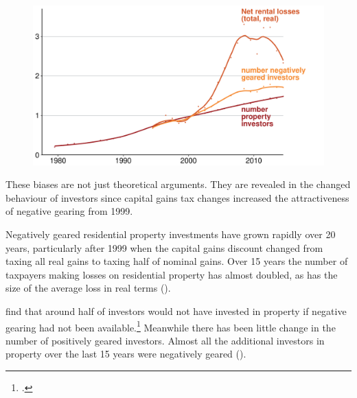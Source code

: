 \begin{figure}
\label{fig:number-NG-and-net-losses-time-series}
\includegraphics[width=1.16\columnwidth]{CGT-NG-atlas/NG-over-time.pdf}
\end{figure}

These biases are not just theoretical arguments. 
They are revealed in the changed behaviour of investors since capital gains tax changes increased the attractiveness of negative gearing from 1999.

Negatively geared residential property investments have grown rapidly over 20 years, particularly after 1999 when the capital gains discount changed from taxing all real gains to taxing half of nominal gains. 
Over 15 years the number of taxpayers making losses on residential property has almost doubled, as has the size of the average loss in real terms ().  






\textcite{seelig2009understanding} find that around half of investors would not have invested in property if negative gearing had not been available.\footcite[][63]{seelig2009understanding} 
Meanwhile there has been little change in the number of positively geared investors. Almost all the additional investors in property over the last 15 years were negatively geared ().

